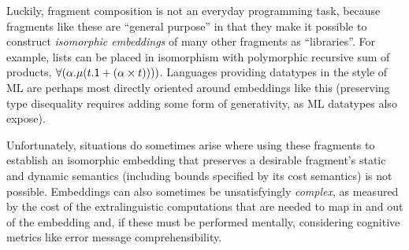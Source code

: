 \documentclass[9pt,preprint]{sigplanconf}
\begin{document}
Luckily, fragment composition is not an everyday programming task, because fragments like these are ``general purpose'' in that they make it possible to construct \emph{isomorphic embeddings} of many other fragments as ``libraries''. For example, lists can be placed in isomorphism with polymorphic recursive sum of products, $\forall(\alpha.\mu(t.{\sf 1} + (\alpha \times t))))$. Languages providing datatypes in the style of ML  are perhaps most directly oriented around embeddings like this (preserving type disequality requires adding some form of generativity, as ML datatypes also expose). %

Unfortunately, situations do sometimes arise where using these fragments to establish an isomorphic embedding that preserves a desirable fragment's  static and dynamic semantics (including bounds specified by its cost semantics) is not possible. 
Embeddings can also sometimes be unsatisfyingly \emph{complex}, as measured by the cost of the extralinguistic computations that are needed to map in and out of the embedding and, if these  must be performed mentally, considering  cognitive metrics like  error message comprehensibility. %
\end{document}
